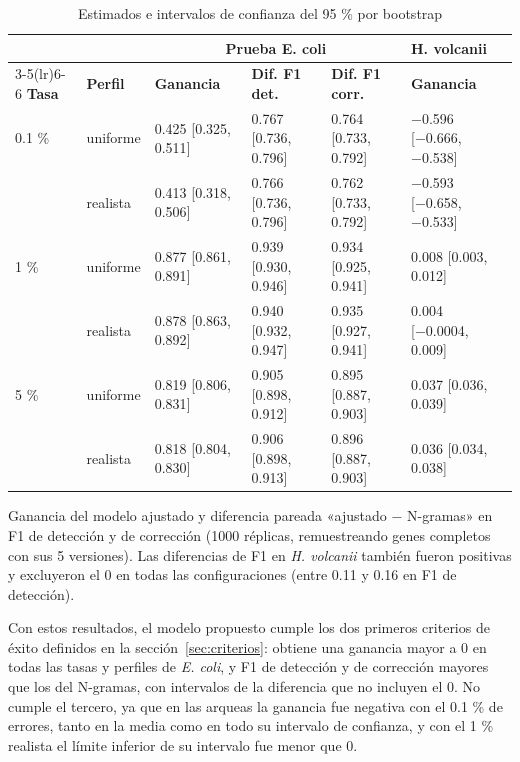 \documentclass[sigconf,nonacm]{acmart}
\begin{document}
\begin{table}[t]
\caption{Estimados e intervalos de confianza del 95 \% por bootstrap}
\label{tab:bootstrap}
\small
\begin{tabular}{llllll}
\toprule
 & & \multicolumn{3}{c}{\textbf{Prueba E. coli}} & \textbf{H. volcanii} \\
\cmidrule(lr){3-5}\cmidrule(lr){6-6}
\textbf{Tasa} & \textbf{Perfil} & \textbf{Ganancia} & \textbf{Dif. F1 det.} & \textbf{Dif. F1 corr.} & \textbf{Ganancia} \\
\midrule
0.1 \% & uniforme & 0.425 {[}0.325, 0.511{]} & 0.767 {[}0.736, 0.796{]} & 0.764 {[}0.733, 0.792{]} & −0.596 {[}−0.666, −0.538{]} \\
 & realista & 0.413 {[}0.318, 0.506{]} & 0.766 {[}0.736, 0.796{]} & 0.762 {[}0.733, 0.792{]} & −0.593 {[}−0.658, −0.533{]} \\
\midrule
1 \% & uniforme & 0.877 {[}0.861, 0.891{]} & 0.939 {[}0.930, 0.946{]} & 0.934 {[}0.925, 0.941{]} & 0.008 {[}0.003, 0.012{]} \\
 & realista & 0.878 {[}0.863, 0.892{]} & 0.940 {[}0.932, 0.947{]} & 0.935 {[}0.927, 0.941{]} & 0.004 {[}−0.0004, 0.009{]} \\
\midrule
5 \% & uniforme & 0.819 {[}0.806, 0.831{]} & 0.905 {[}0.898, 0.912{]} & 0.895 {[}0.887, 0.903{]} & 0.037 {[}0.036, 0.039{]} \\
 & realista & 0.818 {[}0.804, 0.830{]} & 0.906 {[}0.898, 0.913{]} & 0.896 {[}0.887, 0.903{]} & 0.036 {[}0.034, 0.038{]} \\
\bottomrule
\end{tabular}

\vspace{2pt}\begin{minipage}{\textwidth}\footnotesize Ganancia del modelo ajustado y diferencia pareada «ajustado − N-gramas» en F1 de detección y de corrección (1000 réplicas, remuestreando genes completos con sus 5 versiones). Las diferencias de F1 en \emph{H. volcanii} también fueron positivas y excluyeron el 0 en todas las configuraciones (entre 0.11 y 0.16 en F1 de detección).\end{minipage}
\end{table}

Con estos resultados, el modelo propuesto cumple los dos primeros criterios de éxito definidos en la sección~\ref{sec:criterios}: obtiene una ganancia mayor a 0 en todas las tasas y perfiles de \emph{E. coli}, y F1 de detección y de corrección mayores que los del N-gramas, con intervalos de la diferencia que no incluyen el 0. No cumple el tercero, ya que en las arqueas la ganancia fue negativa con el 0.1 \% de errores, tanto en la media como en todo su intervalo de confianza, y con el 1 \% realista el límite inferior de su intervalo fue menor que 0.
\end{document}
